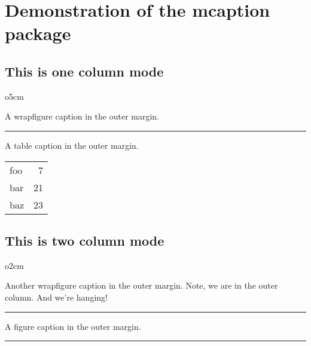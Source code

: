 \documentclass{book}
\begin{document}
\setlength{\margincapsep}{3\columnsep}
\chapter{Demonstration of the mcaption package}
\section{This is one column mode}
\blindtext[1]

\begin{wrapfigure}{o}{5cm}
  \begin{margincap}{A wrapfigure caption in the outer margin.}
    \rule{5cm}{2cm}
  \end{margincap}
\end{wrapfigure}
\blindtext[1]
\begin{table}
  \begin{margincap}{A table caption in the outer margin.}
    \centering
    \begin{tabular}[\margincapalign]{@{}lr@{}}
      foo & 7\\
      bar & 21 \\
      baz & 23 \\
    \end{tabular}
  \end{margincap}
\end{table}

\twocolumn
\section{This is two column mode}
\blindtext[1]

\begin{wrapfigure}{o}{2cm}
  \begin{margincap}{Another wrapfigure caption in the outer margin.
       Note, we are in the outer column. And we're hanging!}
    \rule{2cm}{1cm}
  \end{margincap}
\end{wrapfigure}
\blindtext[5]
\begin{figure*}
  \begin{margincap}{A figure caption in the outer margin.}
    \centering
    \rule{10cm}{2cm}
  \end{margincap}
\end{figure*}
\end{document}
